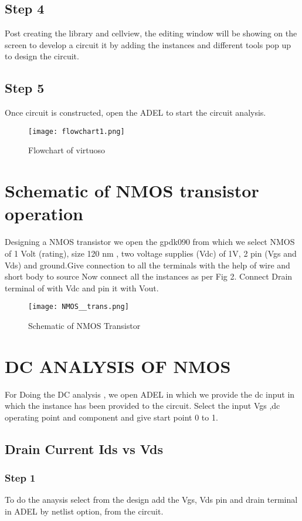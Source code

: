 \documentclass[conference]{IEEEtran}
\begin{document}
\subsection{Step 4}
Post creating the library and cellview, the editing window will be showing  on the screen to develop a circuit it by adding the instances and different tools pop up to design the circuit.
\subsection{Step 5}
Once circuit is constructed, open the ADEL to start the circuit analysis.
\begin{figure}
    \centering
    \texttt{[image: flowchart1.png]}
    \caption{Flowchart of virtuoso}
    \label{figure1}
\end{figure}

  \section{Schematic of NMOS transistor operation}
 Designing  a NMOS transistor we open the gpdk090 from which we select NMOS of 1 Volt (rating), size 120 nm , two voltage supplies (Vdc) of 1V,  2 pin (Vgs and Vds) and ground.Give connection to all the terminals with the help of wire and short body to source Now connect all the instances as per Fig 2. Connect Drain terminal of with Vdc and pin it with Vout.
 \begin{figure}
     \centering
     \texttt{[image: NMOS\_\_trans.png]}
     \caption{Schematic of NMOS Transistor}
     \label{Schematic of nmos transistor}
 \end{figure}
     
 

    

\section{DC ANALYSIS OF NMOS}
For Doing the DC analysis , we open ADEL in which we provide the dc input in which the instance has been provided to the circuit. Select the input Vgs ,dc operating point and component and give start point 0 to 1.
 


\subsection{Drain Current Ids vs Vds}
\subsubsection{Step 1}
To do the anaysis select from the design add the Vgs, Vds pin and drain terminal in ADEL by netlist option, from the circuit.
\end{document}
